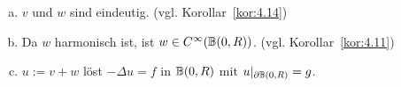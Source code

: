 \begin{bem}
  \label{bem:5.13}
  \begin{enumerate}[(a)]
  \item $v$ und $w$ sind eindeutig. (vgl. Korollar~\ref{kor:4.14})
  \item Da $w$ harmonisch ist, ist $w\in C^\infty(\mathbb{B}(0,R))$. (vgl. Korollar~\ref{kor:4.11})
  \item $u:=v+w$ löst $-\Delta u=f$ in $\mathbb{B}(0,R)$ mit $u\rvert_{\partial\mathbb{B}(0,R)}=g$.
  \end{enumerate}
\end{bem}


